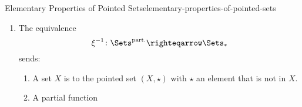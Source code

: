 \begin{proposition}{Elementary Properties of Pointed Sets}{elementary-properties-of-pointed-sets}
\begin{enumerate}
\begin{enumerate}
\[                        \colon%
                        \Sets_{*}%
                        \righteqarrow%
                        \Sets^{\mathrm{part.}}%
                    \]%
                    sends:
                    \begin{enumerate}
                        \item\label{elementary-properties-of-pointed-sets-relation-to-partial-functions-a-i}A pointed set $(X,x_{0})$ to $X$.
                        \item\label{elementary-properties-of-pointed-sets-relation-to-partial-functions-a-ii}A pointed function
                            \[
                                f%
                                \colon%
                                (X,x_{0})%
                                \to%
                                (Y,y_{0})%
                            \]%
                             to the partial function
                            \[
                                \xi_{f}%
                                \colon%
                                X%
                                \to%
                                Y%
                            \]%
                            defined on $f^{-1}(Y\setminus y_{0})$ and defined by
                            \[
                                \xi_{f}(x)%
                                \defeq%
                                f(x)%
                            \]%
                            for each $x\in f^{-1}(Y\setminus y_{0})$.
                    \end{enumerate}
                \item\label{elementary-properties-of-pointed-sets-relation-to-partial-functions-b}The equivalence
                    \[
                        \xi^{-1}%
                        \colon%
                        \Sets^{\mathrm{part.}}%
                        \righteqarrow%
                        \Sets_{*}%
                    \]%
                    sends:
                    \begin{enumerate}
                        \item\label{elementary-properties-of-pointed-sets-relation-to-partial-functions-b-i}A set $X$ is to the pointed set $(X,\star)$ with $\star$ an element that is not in $X$.
                        \item\label{elementary-properties-of-pointed-sets-relation-to-partial-functions-b-ii}A partial function
                            \[
\]
\end{enumerate}
\end{enumerate}
\end{enumerate}
\end{proposition}
